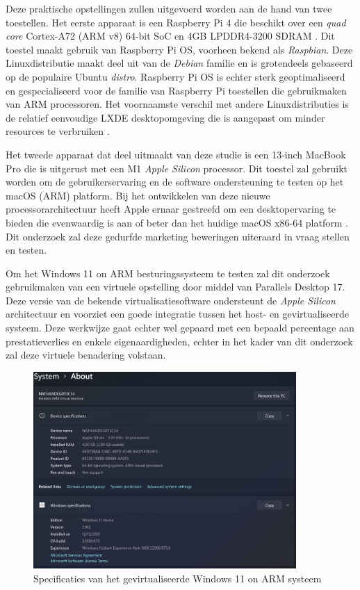 Deze praktische opstellingen zullen uitgevoerd worden aan de hand van twee toestellen. Het eerste apparaat is een Raspberry Pi 4 die beschikt over een \textit{quad core} Cortex-A72 (ARM v8) 64-bit SoC en 4GB LPDDR4-3200 SDRAM \autocite{Pi2021}. Dit toestel maakt gebruik van Raspberry Pi OS, voorheen bekend als \textit{Raspbian}. Deze Linuxdistributie maakt deel uit van de \textit{Debian} familie en is grotendeels gebaseerd op de populaire Ubuntu \textit{distro}. Raspberry Pi OS is echter sterk geoptimaliseerd en gespecialiseerd voor de familie van Raspberry Pi toestellen die gebruikmaken van ARM processoren. Het voornaamste verschil met andere Linuxdistributies is de relatief eenvoudige LXDE desktopomgeving die is aangepast om minder resources te verbruiken \autocite{Pi2011}.

Het tweede apparaat dat deel uitmaakt van deze studie is een 13‑inch MacBook Pro die is uitgerust met een M1 \textit{Apple Silicon} processor. Dit toestel zal gebruikt worden om de gebruikerservaring en de software ondersteuning te testen op het macOS (ARM) platform. Bij het ontwikkelen van deze nieuwe processorarchitectuur heeft Apple ernaar gestreefd om een desktopervaring te bieden die evenwaardig is aan of beter dan het huidige macOS x86-64 platform \autocite{Apple2020}. Dit onderzoek zal deze gedurfde marketing beweringen uiteraard in vraag stellen en testen.

Om het Windows 11 on ARM besturingssysteem te testen zal dit onderzoek gebruikmaken van een virtuele opstelling door middel van Parallels Desktop 17. Deze versie van de bekende virtualisatiesoftware ondersteunt de \textit{Apple Silicon} architectuur en voorziet een goede integratie tussen het host- en gevirtualiseerde systeem. Deze werkwijze gaat echter wel gepaard met een bepaald percentage aan prestatieverlies en enkele eigenaardigheden, echter in het kader van dit onderzoek zal deze virtuele benadering volstaan.

\begin{figure}[h]
	\centering
	\includegraphics[width=100mm, scale=0.5]{img/specificaties_winARM.png}
	\caption{Specificaties van het gevirtualiseerde Windows 11 on ARM systeem}
	\end{figure}

